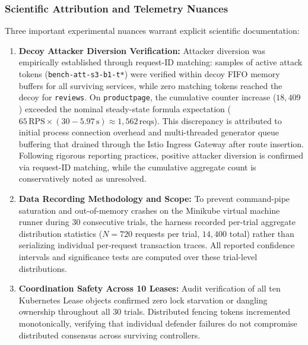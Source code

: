 \subsubsection{Scientific Attribution and Telemetry Nuances}
Three important experimental nuances warrant explicit scientific documentation:
\begin{enumerate}
    \item \textbf{Decoy Attacker Diversion Verification:} Attacker diversion was empirically established through request-ID matching: samples of active attack tokens (\texttt{bench-att-s3-b1-t*}) were verified within decoy FIFO memory buffers for all surviving services, while zero matching tokens reached the decoy for \texttt{reviews}. On \texttt{productpage}, the cumulative counter increase ($18,409$) exceeded the nominal steady-state formula expectation ($65\,\text{RPS} \times (30 - 5.97\,\text{s}) \approx 1,562\,\text{reqs}$). This discrepancy is attributed to initial process connection overhead and multi-threaded generator queue buffering that drained through the Istio Ingress Gateway after route insertion. Following rigorous reporting practices, positive attacker diversion is confirmed via request-ID matching, while the cumulative aggregate count is conservatively noted as unresolved.
    \item \textbf{Data Recording Methodology and Scope:} To prevent command-pipe saturation and out-of-memory crashes on the Minikube virtual machine runner during 30 consecutive trials, the harness recorded per-trial aggregate distribution statistics ($N=720$ requests per trial, $14,400$ total) rather than serializing individual per-request transaction traces. All reported confidence intervals and significance tests are computed over these trial-level distributions.
    \item \textbf{Coordination Safety Across 10 Leases:} Audit verification of all ten Kubernetes Lease objects confirmed zero lock starvation or dangling ownership throughout all 30 trials. Distributed fencing tokens incremented monotonically, verifying that individual defender failures do not compromise distributed consensus across surviving controllers.
\end{enumerate}
